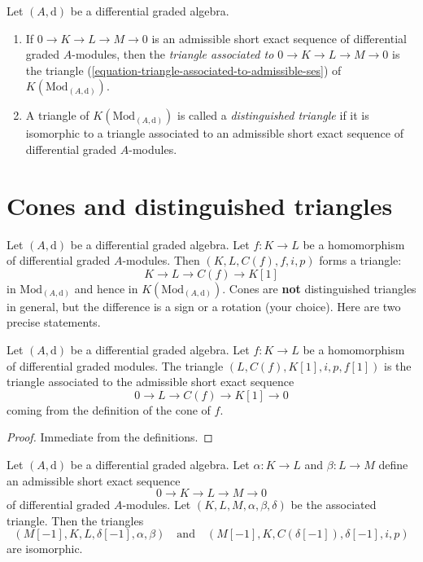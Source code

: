\begin{definition}
\label{definition-distinguished-triangle}
Let $(A, \text{d})$ be a differential graded algebra.
\begin{enumerate}
\item If $0 \to K \to L \to M \to 0$ is an admissible short exact sequence
of differential graded $A$-modules, then the {\it triangle associated
to $0 \to K \to L \to M \to 0$} is the triangle 
(\ref{equation-triangle-associated-to-admissible-ses})
of $K(\text{Mod}_{(A, \text{d})})$.
\item A triangle of $K(\text{Mod}_{(A, \text{d})})$ is called a
{\it distinguished triangle} if it is isomorphic to a triangle
associated to an admissible short exact sequence
of differential graded $A$-modules.
\end{enumerate}
\end{definition}









\section{Cones and distinguished triangles}
\label{section-cones-and-triangles}

\noindent
Let $(A, \text{d})$ be a differential graded algebra.
Let $f : K \to L$ be a homomorphism of differential graded $A$-modules.
Then $(K, L, C(f), f, i, p)$ forms a triangle:
$$
K \to L \to C(f) \to K[1]
$$
in $\text{Mod}_{(A, \text{d})}$ and hence in $K(\text{Mod}_{(A, \text{d})})$.
Cones are {\bf not} distinguished triangles in general, but the difference
is a sign or a rotation (your choice). Here are two precise statements.

\begin{lemma}
\label{lemma-rotate-cone}
Let $(A, \text{d})$ be a differential graded algebra.
Let $f : K \to L$ be a homomorphism of differential graded modules.
The triangle $(L, C(f), K[1], i, p, f[1])$ is
the triangle associated to the admissible short exact sequence
$$
0 \to L \to C(f) \to K[1] \to 0
$$
coming from the definition of the cone of $f$.
\end{lemma}

\begin{proof}
Immediate from the definitions.
\end{proof}

\begin{lemma}
\label{lemma-rotate-triangle}
Let $(A, \text{d})$ be a differential graded algebra.
Let $\alpha : K \to L$ and $\beta : L \to M$
define an admissible short exact sequence
$$
0 \to K \to L \to M \to 0
$$
of differential graded $A$-modules.
Let $(K, L, M, \alpha, \beta, \delta)$
be the associated triangle. Then the triangles
$$
(M[-1], K, L, \delta[-1], \alpha, \beta)
\quad\text{and}\quad
(M[-1], K, C(\delta[-1]), \delta[-1], i, p)
$$
are isomorphic.
\end{lemma}

